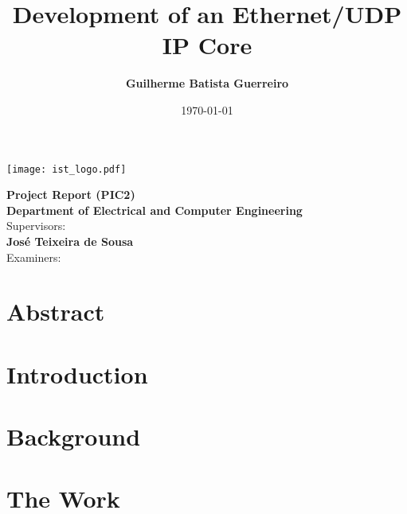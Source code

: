\documentclass{esda}
\title{\bf \titlefont Development of an Ethernet/UDP IP Core}
\author{\bf \authorfont Guilherme Batista Guerreiro}
\date{\today}
\begin{document}
\texttt{[image: ist\_logo.pdf]}
\vspace{2.5cm}

{\let\newpage\relax\maketitle}

\vspace{1.5cm}
\begin{center}
\begin{Large}
  {\bf Project Report (PIC2)}\\
  \vspace{1cm}
  {\bf Department of Electrical and Computer Engineering}\\
  \vspace{1cm}
  Supervisors:\\
  \vspace{0.5cm}
  {\bf José Teixeira de Sousa}\\
  \vspace{1cm}
  Examiners:\\
  \vspace{0.5cm}
\end{Large}
\end{center}

\cleardoublepage
{}
\setcounter{page}{1}

\section*{Abstract}


\cleardoublepage
\tableofcontents
\newpage
\listoftables
\listoffigures

\cleardoublepage
{}
\setcounter{page}{1}

\cleardoublepage
\section{Introduction}
\label{sec:intro}


\cleardoublepage
\section{Background}
\label{sec:back}


\cleardoublepage
\section{The Work}
\label{sec:curr}

\end{document}

